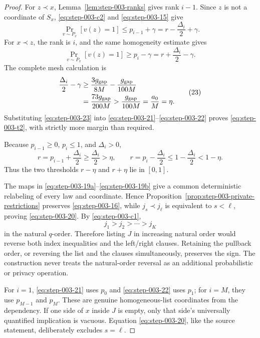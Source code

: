 \begin{proof}

For \(z \prec x\), Lemma~\ref{lem:step-003-ranks} gives rank \(i-1\). Since \(z\) is not a coordinate of \(S_x\), \eqref{eq:step-003-c2} and \eqref{eq:step-003-15} give
\[
\Pr_{v\sim P_x}[v(z)=1]
\le p_{i-1}+\gamma
=r-\frac{\Delta_i}{2}+\gamma.
\tag{21}\label{eq:step-003-21}
\]
For \(x \prec z\), the rank is \(i\), and the same homogeneity estimate gives
\[
\Pr_{v\sim P_x}[v(z)=1]
\ge p_i-\gamma
=r+\frac{\Delta_i}{2}-\gamma.
\tag{22}\label{eq:step-003-22}
\]
The complete mesh calculation is
\[
\begin{aligned}
\frac{\Delta_i}{2}-\gamma
&\ge
\frac{3g_{\rm gap}}{8M}
-\frac{g_{\rm gap}}{100M}\\
&=\frac{73g_{\rm gap}}{200M}
>\frac{g_{\rm gap}}{100M}
=\frac{a_0}{M}
=\eta.
\end{aligned}
\tag{23}\label{eq:step-003-23}
\]
Substituting \eqref{eq:step-003-23} into \eqref{eq:step-003-21}--\eqref{eq:step-003-22} proves \eqref{eq:step-003-t2}, with strictly more margin than required.

Because \(p_{i-1}\ge 0\), \(p_i\le 1\), and \(\Delta_i>0\),
\[
r=p_{i-1}+\frac{\Delta_i}{2}
\ge\frac{\Delta_i}{2}>\eta,
\qquad
r=p_i-\frac{\Delta_i}{2}
\le1-\frac{\Delta_i}{2}<1-\eta.
\tag{24}\label{eq:step-003-24}
\]
Thus the two thresholds \(r-\eta\) and \(r+\eta\) lie in \([0,1]\).

The maps in \eqref{eq:step-003-19a}--\eqref{eq:step-003-19b} give a common deterministic relabeling of every law and coordinate. Hence Proposition~\ref{prop:step-003-private-restrictions} preserves \eqref{eq:step-003-16}, while \(j_s \prec j_\ell\) is equivalent to \(s<\ell\), proving \eqref{eq:step-003-20}. By \eqref{eq:step-003-c1},
\[
j_1>j_2>\cdots>j_K
\tag{25}\label{eq:step-003-25}
\]
in the natural \(q\)-order. Therefore listing \(J\) in increasing natural order would reverse both index inequalities and the left/right clauses. Retaining the pullback order, or reversing the list and the clauses simultaneously, preserves the sign. The construction never treats the natural-order reversal as an additional probabilistic or privacy operation.

For \(i=1\), \eqref{eq:step-003-21} uses \(p_0\) and \eqref{eq:step-003-22} uses \(p_1\); for \(i=M\), they use \(p_{M-1}\) and \(p_M\). These are genuine homogeneous-list coordinates from the dependency. If one side of \(x\) inside \(J\) is empty, only that side's universally quantified implication is vacuous. Equation \eqref{eq:step-003-20}, like the source statement, deliberately excludes \(s=\ell\).

\end{proof}

